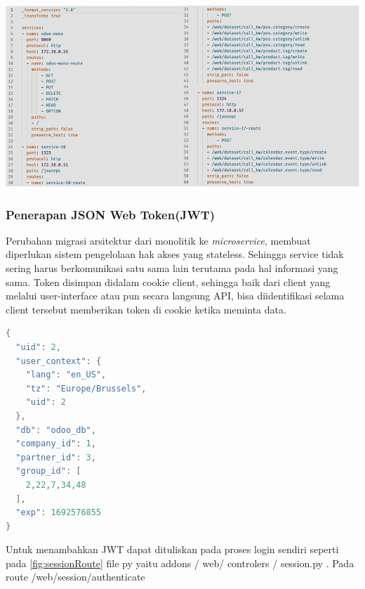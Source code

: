 \begin{center}
	\includegraphics[width=14cm]{img/bab_4/kong_yml.png}
	\label{fig:kong_yml}
\end{center}
 	
\subsubsection{Penerapan JSON Web  Token(JWT)}
Perubahan migrasi arsitektur dari monolitik ke \textit{microservice}, membuat diperlukan sistem pengelolaan hak akses yang stateless. Sehingga service tidak sering harus berkomunikasi satu sama lain terutama pada hal informasi yang sama. Token disimpan didalam cookie client, sehingga baik dari client yang melalui user-interface atau pun secara langsung API, bisa diidentifikasi selama client tersebut memberikan token di cookie ketika meminta data.

\begin{lstlisting}[style=mystyle, language=java, caption={Isi data berupa JSON di JWT}]
{
  "uid": 2,
  "user_context": {
    "lang": "en_US",
    "tz": "Europe/Brussels",
    "uid": 2
  },
  "db": "odoo_db",
  "company_id": 1,
  "partner_id": 3,
  "group_id": [
    2,22,7,34,48
  ],
  "exp": 1692576855
}
\end{lstlisting} 


Untuk menambahkan JWT dapat dituliskan pada proses login sendiri seperti pada \ref{fig:sessionRoute} file py yaitu addons / web/ controlers / session.py . Pada route  /web/session/authenticate 

